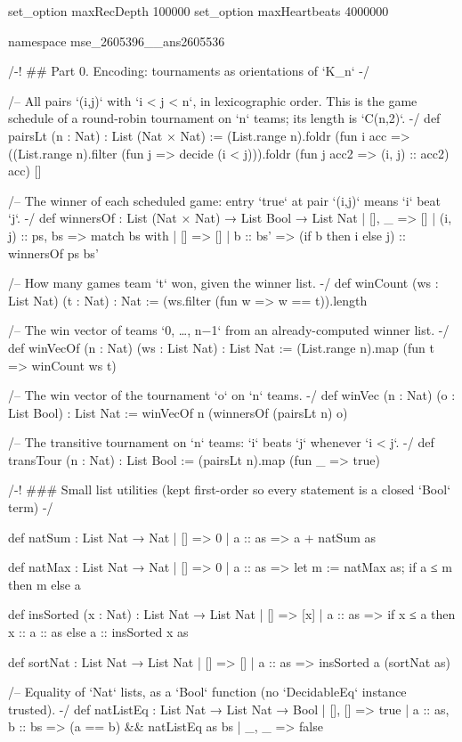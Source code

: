 \documentclass[11pt]{article}
\begin{document}
\begin{Vlean}
set_option maxRecDepth 100000
set_option maxHeartbeats 4000000

namespace mse_2605396__ans2605536

/-! ## Part 0. Encoding: tournaments as orientations of `K_n` -/

/-- All pairs `(i,j)` with `i < j < n`, in lexicographic order.  This is the game schedule of
a round-robin tournament on `n` teams; its length is `C(n,2)`. -/
def pairsLt (n : Nat) : List (Nat × Nat) :=
  (List.range n).foldr (fun i acc =>
    ((List.range n).filter (fun j => decide (i < j))).foldr
      (fun j acc2 => (i, j) :: acc2) acc) []

/-- The winner of each scheduled game: entry `true` at pair `(i,j)` means `i` beat `j`. -/
def winnersOf : List (Nat × Nat) → List Bool → List Nat
  | [], _ => []
  | (i, j) :: ps, bs =>
      match bs with
      | [] => []
      | b :: bs' => (if b then i else j) :: winnersOf ps bs'

/-- How many games team `t` won, given the winner list. -/
def winCount (ws : List Nat) (t : Nat) : Nat :=
  (ws.filter (fun w => w == t)).length

/-- The win vector of teams `0, …, n−1` from an already-computed winner list. -/
def winVecOf (n : Nat) (ws : List Nat) : List Nat :=
  (List.range n).map (fun t => winCount ws t)

/-- The win vector of the tournament `o` on `n` teams. -/
def winVec (n : Nat) (o : List Bool) : List Nat :=
  winVecOf n (winnersOf (pairsLt n) o)

/-- The transitive tournament on `n` teams: `i` beats `j` whenever `i < j`. -/
def transTour (n : Nat) : List Bool := (pairsLt n).map (fun _ => true)

/-! ### Small list utilities (kept first-order so every statement is a closed `Bool` term) -/

def natSum : List Nat → Nat
  | [] => 0
  | a :: as => a + natSum as

def natMax : List Nat → Nat
  | [] => 0
  | a :: as => let m := natMax as; if a ≤ m then m else a

def insSorted (x : Nat) : List Nat → List Nat
  | [] => [x]
  | a :: as => if x ≤ a then x :: a :: as else a :: insSorted x as

def sortNat : List Nat → List Nat
  | [] => []
  | a :: as => insSorted a (sortNat as)

/-- Equality of `Nat` lists, as a `Bool` function (no `DecidableEq` instance trusted). -/
def natListEq : List Nat → List Nat → Bool
  | [], [] => true
  | a :: as, b :: bs => (a == b) && natListEq as bs
  | _, _ => false


\end{Vlean}
\end{document}
